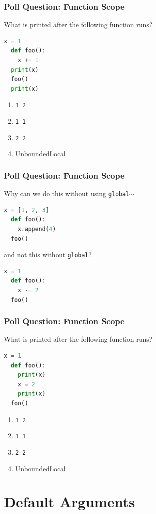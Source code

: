 \documentclass{beamer}
\begin{document}
%
%
\begin{frame}[fragile]
  \frametitle{Poll Question: Function Scope}
  What is printed after the following function runs?
  \begin{lstlisting}[language=Python, autogobble]
  x = 1
  def foo():
    x += 1
  print(x)
  foo()
  print(x)
  \end{lstlisting}
  \vfill
  \begin{enumerate}[A]
    \item \lstinline|1 2|
    \item \lstinline|1 1|
    \item \lstinline|2 2|
    \item UnboundedLocal
  \end{enumerate}
\end{frame}

%
%
\begin{frame}[fragile]
  \frametitle{Poll Question: Function Scope}
  Why can we do this without using \lstinline|global|$\cdots$
  \vfill
  \begin{lstlisting}[language=Python, autogobble]
  x = [1, 2, 3]
  def foo():
    x.append(4)
  foo()
  \end{lstlisting}
  \vfill
  and not this without \lstinline|global|?
  \vfill
  \begin{lstlisting}[language=Python, autogobble]
  x = 1
  def foo():
    x -= 2
  foo()
  \end{lstlisting}
\end{frame}


%
%
\begin{frame}[fragile]
  \frametitle{Poll Question: Function Scope}
  What is printed after the following function runs?
  \begin{lstlisting}[language=Python, autogobble]
  x = 1
  def foo():
    print(x)
    x = 2
    print(x)
  foo()
  \end{lstlisting}
  \vfill
  \begin{enumerate}[A]
    \item \lstinline|1 2|
    \item \lstinline|1 1|
    \item \lstinline|2 2|
    \item UnboundedLocal
  \end{enumerate}
\end{frame}


\section{Default Arguments}
\end{document}
